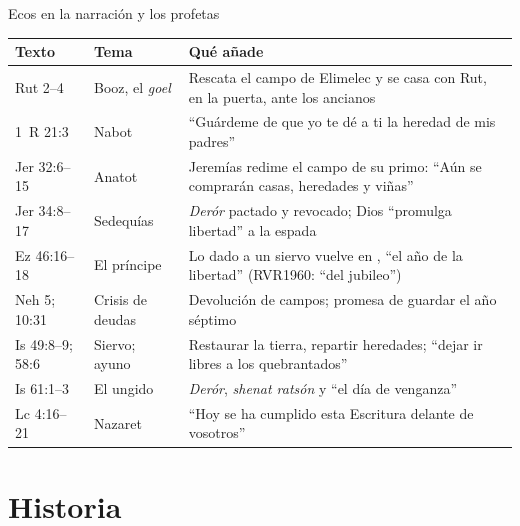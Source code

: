\begin{frame}{Ecos en la narración y los profetas}
\fontsize{6.6}{7.8}\selectfont\renewcommand{\arraystretch}{1.12}
\begin{tabular}{@{}L{1.9cm}L{2.5cm}L{7.6cm}@{}}
\toprule
\textbf{Texto} & \textbf{Tema} & \textbf{Qué añade} \\ \midrule
Rut 2--4 & Booz, el \emph{goel} & Rescata el campo de Elimelec y se casa con Rut, en la puerta, ante los ancianos \\
1~R 21:3 & Nabot & ``Guárdeme \SENOR{} de que yo te dé a ti la heredad de mis padres'' \\
Jer 32:6--15 & Anatot & Jeremías redime el campo de su primo: ``Aún se comprarán casas, heredades y viñas'' \\
Jer 34:8--17 & Sedequías & \emph{Derór} pactado y revocado; Dios ``promulga libertad'' a la espada \\
Ez 46:16--18 & El príncipe & Lo dado a un siervo vuelve en , ``el año de la libertad'' (RVR1960: ``del jubileo'') \\
Neh 5; 10:31 & Crisis de deudas & Devolución de campos; promesa de guardar el año séptimo \\
Is 49:8--9; 58:6 & Siervo; ayuno & Restaurar la tierra, repartir heredades; ``dejar ir libres a los quebrantados'' \\
Is 61:1--3 & El ungido & \emph{Derór}, \emph{shenat ratsón} y ``el día de venganza'' \\
Lc 4:16--21 & Nazaret & ``Hoy se ha cumplido esta Escritura delante de vosotros'' \\
\bottomrule
\end{tabular}
\end{frame}

\section{Historia}

